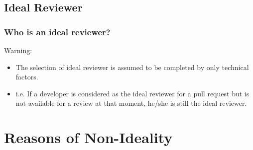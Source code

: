 \documentclass{beamer}
\begin{document}
\subsection{Ideal Reviewer}
\begin{frame}
\frametitle{\large Who is an ideal reviewer?}
    \pause
    \begin{alertblock}{Warning:}
        \begin{itemize}
        \item The selection of ideal reviewer is assumed to be completed by only technical factors.
        \item i.e. If a developer is considered as the ideal reviewer for a pull request but is not available for a review at that moment, he/she is still the ideal reviewer.
        \end{itemize}
    \end{alertblock}
\end{frame}
\fi

\section{Reasons of Non-Ideality}
\end{document}
